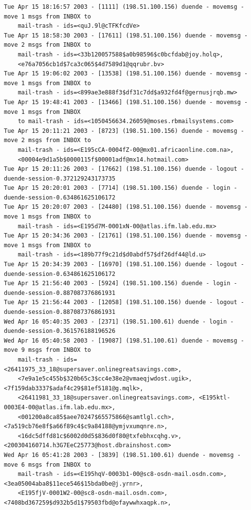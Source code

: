 \begin{lstlisting}[style=terminal]
Tue Apr 15 18:16:57 2003 - [1111] (198.51.100.156) duende - movemsg - move 1 msgs from INBOX to 
    mail-trash - ids=<quJ.9l@cTFKfcdVe>
Tue Apr 15 18:58:30 2003 - [17611] (198.51.100.156) duende - movemsg - move 2 msgs from INBOX to 
    mail-trash - ids=<33b120057588$a0b98596$c0bcfdab@joy.holq>, 
    <e76a7056cb1d$7ca3c065$4d7589d1@qqrubr.bv>
Tue Apr 15 19:06:02 2003 - [13538] (198.51.100.156) duende - movemsg - move 1 msgs from INBOX to 
    mail-trash - ids=<899ae3e888f3$df31c7dd$a932fd4f@gernusjrqb.mw>
Tue Apr 15 19:48:41 2003 - [13466] (198.51.100.156) duende - movemsg - move 1 msgs from INBOX 
    to mail-trash - ids=<1050456634.26059@moses.rbmailsystems.com>
Tue Apr 15 20:11:21 2003 - [8723] (198.51.100.156) duende - movemsg - move 2 msgs from INBOX to 
    mail-trash - ids=<E195cCA-0004fZ-00@mx01.africaonline.com.na>, 
    <00004e9d1a5b$0000115f$00001adf@mx14.hotmail.com>
Tue Apr 15 20:11:26 2003 - [17662] (198.51.100.156) duende - logout - duende-session-0.372129243173735
Tue Apr 15 20:20:01 2003 - [7714] (198.51.100.156) duende - login - duende-session-0.634861625106172
Tue Apr 15 20:20:07 2003 - [24480] (198.51.100.156) duende - movemsg - move 1 msgs from INBOX to 
    mail-trash - ids=<E195d7M-0001xN-00@atlas.ifm.lab.edu.mx>
Tue Apr 15 20:34:36 2003 - [21761] (198.51.100.156) duende - movemsg - move 1 msgs from INBOX to 
    mail-trash - ids=<189b77f9c21d$d0abdf57$df26df44@ld.u>
Tue Apr 15 20:34:39 2003 - [16970] (198.51.100.156) duende - logout - duende-session-0.634861625106172
Tue Apr 15 21:56:40 2003 - [5924] (198.51.100.156) duende - login - duende-session-0.887087376861931
Tue Apr 15 21:56:44 2003 - [12058] (198.51.100.156) duende - logout - duende-session-0.887087376861931
Wed Apr 16 05:40:35 2003 - [2371] (198.51.100.61) duende - login - duende-session-0.361576188196526
Wed Apr 16 05:40:58 2003 - [19087] (198.51.100.61) duende - movemsg - move 9 msgs from INBOX to 
    mail-trash - ids=<26411975_33_18@supersaver.onlinegreatsavings.com>, 
    <7e9a1e5c455b$320b65c3$cc4e38e2@vmaeqjwdost.ugik>, <7f159dab3337$adaf4c29$81ef5181@g.mqlk>, 
    <26411981_33_18@supersaver.onlinegreatsavings.com>, <E195ktl-0003E4-00@atlas.ifm.lab.edu.mx>, 
    <001200a8ca85$aee70247$65575866@samtlgl.cch>, <7a519cb76e8f$a66f89c4$c9a84188@ymjvxumqnre.n>, 
    <16dc5dffd81c$6002d0d5$836d0f80@txfebhxcqhg.v>, <200304160714.h3G7EeC25773@host.dbrainshost.com>
Wed Apr 16 05:41:28 2003 - [3839] (198.51.100.61) duende - movemsg - move 6 msgs from INBOX to 
    mail-trash - ids=<E195hqV-0003b1-00@sc8-osdn-mail.osdn.com>, <3ea05004aba8$11ece546$15bda0be@j.yrnr>, 
    <E195fjV-0001W2-00@sc8-osdn-mail.osdn.com>, <7408bd367259$d932b5d1$79503fbd@ofaywwhxaqpk.n>, 

\end{lstlisting}
